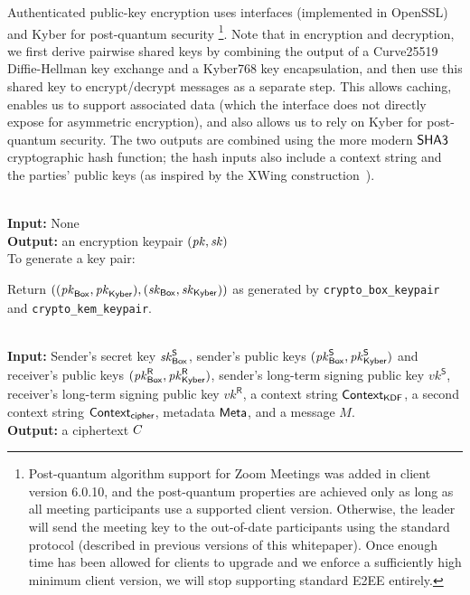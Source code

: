 Authenticated public-key encryption uses \sodium{} interfaces (implemented in OpenSSL) and Kyber for post-quantum security%
%
\footnote{Post-quantum algorithm support for Zoom Meetings was added in client version 6.0.10, and the post-quantum properties are achieved only as long as all meeting participants use a supported client version. Otherwise, the leader will send the meeting key to the out-of-date participants using the standard protocol (described in previous versions of this whitepaper). Once enough time has been allowed for clients to upgrade and we enforce a sufficiently high minimum client version, we will stop supporting standard E2EE entirely.}.
%
Note that in encryption and decryption, we first
derive pairwise shared keys by combining the output of a Curve25519 Diffie-Hellman key exchange and a Kyber768 key encapsulation, and then use this shared key to encrypt/decrypt messages as a separate step. This allows caching, enables us to support associated data (which the \sodium{} interface does not directly expose for asymmetric encryption), and also allows us to rely on Kyber for post-quantum security. The two outputs are combined using the more modern ${\sf SHA3}$ cryptographic hash function; the hash inputs also include a context string and the parties' public keys (as inspired by the XWing construction~\cite{xwing}).


{\underline {\bf \cboxkeygen}}\\
{\bf Input:} None \\
{\bf Output:} an encryption keypair $(\mathit{pk},\mathit{sk})$ \\

\vspace{-1.5em}
To generate a key pair:

\vspace{-1.5em}
\begingroup
\RaggedRight
\begin{enumerate*}
\item Return $((\mathit{pk}_{{\sf Box}}, \mathit{pk}_{{\sf Kyber}}), (\mathit{sk}_{{\sf Box}},  \mathit{sk}_{{\sf Kyber}}))$ as generated by \texttt{crypto\_box\_keypair} and \texttt{crypto\_kem\_keypair}.
\end{enumerate*}
\endgroup


{\underline {\bf \cboxencrypt}} \\
{\bf Input:} Sender's secret key $\mathit{sk}_{{\sf Box}}^{\sf S}$, sender's public keys $(\mathit{pk}_{{\sf Box}}^{\sf S}, \mathit{pk}_{{\sf Kyber}}^{\sf S})$ and receiver's public keys $(\mathit{pk}_{{\sf Box}}^{\sf R}, \mathit{pk}_{{\sf Kyber}}^{\sf R})$, sender's long-term signing public key $vk^\textsf{S}$, receiver's long-term signing public key $vk^\textsf{R}$, a context string
${\sf Context}_\textsf{KDF}$, a second context string ${\sf Context}_\textsf{cipher}$, metadata ${\sf Meta}$,
and a message $M$. \\
{\bf Output:} a ciphertext $C$ \\

